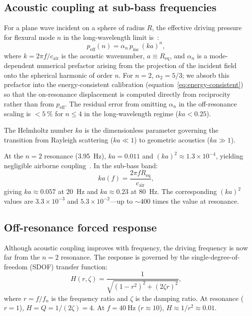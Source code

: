 \subsection{Acoustic coupling at sub-bass frequencies}
\label{sec:coupling}

For a plane wave incident on a sphere of radius $R$, the effective
driving pressure for flexural mode $n$ in the long-wavelength limit
is~\cite{Junger2012}:
%
\begin{equation}
  p_\mathrm{eff}(n) = \alpha_n \, p_\mathrm{inc} \, (ka)^n,
  \label{eq:ka-coupling}
\end{equation}
%
where $k = 2\pi f / c_\mathrm{air}$ is the acoustic wavenumber,
$a \equiv R_\mathrm{eq}$, and $\alpha_n$ is a mode-dependent numerical
prefactor arising from the projection of the incident field onto the
spherical harmonic of order $n$.  For $n = 2$, $\alpha_2 = 5/3$; we
absorb this prefactor into the energy-consistent calibration
(equation~\ref{eq:energy-consistent}) so that the on-resonance
displacement is computed directly from reciprocity rather than from
$p_\mathrm{eff}$.  The residual error from omitting $\alpha_n$ in the
off-resonance scaling is $< \SI{5}{\percent}$ for $n \leq 4$ in the
long-wavelength regime ($ka < 0.25$).

The Helmholtz number $ka$ is the
dimensionless parameter governing the transition from Rayleigh
scattering ($ka \ll 1$) to geometric acoustics ($ka \gg 1$).

At the $n = 2$ resonance (\SI{3.95}{\hertz}), $ka = 0.011$ and
$(ka)^2 \approx 1.3 \times 10^{-4}$, yielding negligible airborne
coupling~\cite{Mace2026browntone}.  In the sub-bass band:
%
\begin{equation}
  ka(f) = \frac{2\pi f R_\mathrm{eq}}{c_\mathrm{air}},
  \label{eq:ka-def}
\end{equation}
%
giving $ka \approx 0.057$ at \SI{20}{\hertz} and $ka \approx 0.23$ at
\SI{80}{\hertz}.  The corresponding $(ka)^2$ values are
$3.3 \times 10^{-3}$ and $5.3 \times 10^{-2}$---up to $\sim$400 times
the value at resonance.

\subsection{Off-resonance forced response}
\label{sec:sdof}

Although acoustic coupling improves with frequency, the driving
frequency is now far from the $n = 2$ resonance.  The response is
governed by the single-degree-of-freedom (SDOF) transfer function:
%
\begin{equation}
  H(r, \zeta) = \frac{1}{\sqrt{(1 - r^2)^2 + (2\zeta r)^2}},
  \label{eq:sdof}
\end{equation}
%
where $r = f / f_n$ is the frequency ratio and $\zeta$ is the damping
ratio.  At resonance ($r = 1$), $H = Q = 1/(2\zeta) = 4$.  At
$f = \SI{40}{\hertz}$ ($r \approx 10$), $H \approx 1/r^2 \approx 0.01$.

